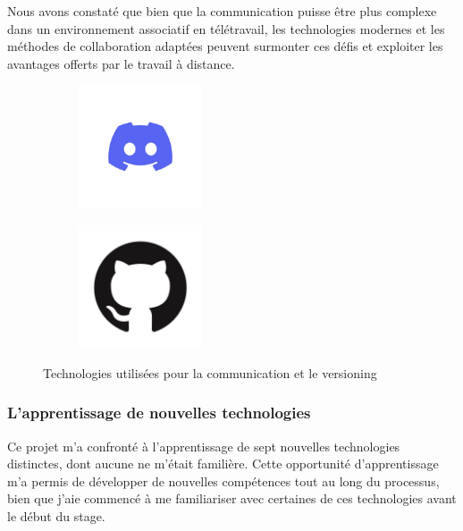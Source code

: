 \medskip

Nous avons constaté que bien que la communication puisse être plus complexe dans un environnement associatif en télétravail, les technologies modernes et les méthodes de collaboration adaptées peuvent surmonter ces défis et exploiter les avantages offerts par le travail à distance.

\begin{figure}
	\centering
	\begin{subfigure}{.45\textwidth}
		\centering
		\includegraphics[width=0.40\textwidth]{assets/discord.jpg}
		\label{fig:discord}
	\end{subfigure}
	\begin{subfigure}{.45\textwidth}
		\centering
		\includegraphics[width=0.40\textwidth]{assets/github.png}
		\label{fig:github}
	\end{subfigure}
	\caption{Technologies utilisées pour la communication et le versioning}
\end{figure}


\subsubsection{L'apprentissage de nouvelles technologies}

Ce projet m'a confronté à l'apprentissage de sept nouvelles technologies distinctes, dont aucune ne m'était familière. Cette opportunité d'apprentissage m'a permis de développer de nouvelles compétences tout au long du processus, bien que j'aie commencé à me familiariser avec certaines de ces technologies avant le début du stage.

